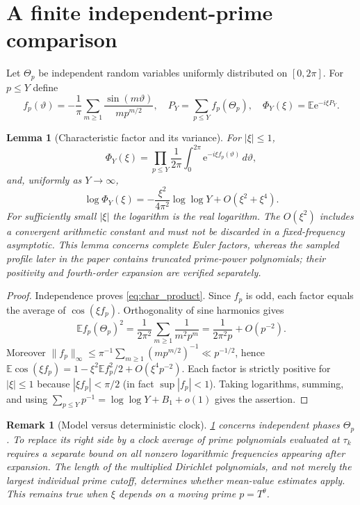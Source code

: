 \documentclass[11pt,reqno]{amsart}
\numberwithin{equation}{section}
\newtheorem{lemma}[theorem]{Lemma}
\newtheorem{remark}[theorem]{Remark}
\newcommand{\e}{\mathrm e}
\begin{document}
\section{A finite independent-prime comparison}\label{sec:model}
Let $\Theta_p$ be independent random variables uniformly distributed on $[0,2\pi]$. For $p\le Y$ define
\begin{equation}\label{eq:phase_model}
f_p(\vartheta)=-\frac1\pi\sum_{m\ge1}\frac{\sin(m\vartheta)}{m p^{m/2}},
\quad P_Y=\sum_{p\le Y}f_p(\Theta_p),
\quad \Phi_Y(\xi)=\mathbb E\e^{-i\xi P_Y}.
\end{equation}
\begin{lemma}[Characteristic factor and its variance]\label{lem:char}
For $|\xi|\le1$,
\begin{equation}\label{eq:char_product}
\Phi_Y(\xi)=\prod_{p\le Y}\frac1{2\pi}\int_0^{2\pi}\e^{-i\xi f_p(\vartheta)}\,d\vartheta,
\end{equation}
and, uniformly as $Y\to\infty$,
\begin{equation}\label{eq:char_asymp}
\log\Phi_Y(\xi)=-\frac{\xi^2}{4\pi^2}\log\log Y+O(\xi^2+\xi^4).
\end{equation}
For sufficiently small $|\xi|$ the logarithm is the real logarithm. The $O(\xi^2)$ includes a convergent arithmetic constant and must not be discarded in a fixed-frequency asymptotic. This lemma concerns complete Euler factors, whereas the sampled profile later in the paper contains truncated prime-power polynomials; their positivity and fourth-order expansion are verified separately.
\end{lemma}
\begin{proof}
Independence proves \eqref{eq:char_product}. Since $f_p$ is odd, each factor equals the average of $\cos(\xi f_p)$. Orthogonality of sine harmonics gives
\begin{equation}\label{eq:variance}
\mathbb E f_p(\Theta_p)^2=\frac1{2\pi^2}\sum_{m\ge1}\frac1{m^2p^m}=
\frac1{2\pi^2p}+O(p^{-2}).
\end{equation}
Moreover $\|f_p\|_\infty\le\pi^{-1}\sum_{m\ge1}(mp^{m/2})^{-1}\ll p^{-1/2}$, hence
$\mathbb E\cos(\xi f_p)=1-\xi^2\mathbb Ef_p^2/2+O(\xi^4p^{-2})$. Each factor is strictly positive for $|\xi|\le1$ because $|\xi f_p|<\pi/2$ (in fact $\sup|f_p|<1$). Taking logarithms, summing, and using $\sum_{p\le Y}p^{-1}=\log\log Y+B_1+o(1)$ gives the assertion.
\end{proof}

\begin{remark}[Model versus deterministic clock]
\cref{lem:char} concerns independent phases $\Theta_p$. To replace its right side by a clock average of prime polynomials evaluated at $\tau_k$ requires a separate bound on all nonzero logarithmic frequencies appearing after expansion. The length of the multiplied Dirichlet polynomials, and not merely the largest individual prime cutoff, determines whether mean-value estimates apply. This remains true when $\xi$ depends on a moving prime $p=T^\theta$.
\end{remark}
\end{document}
